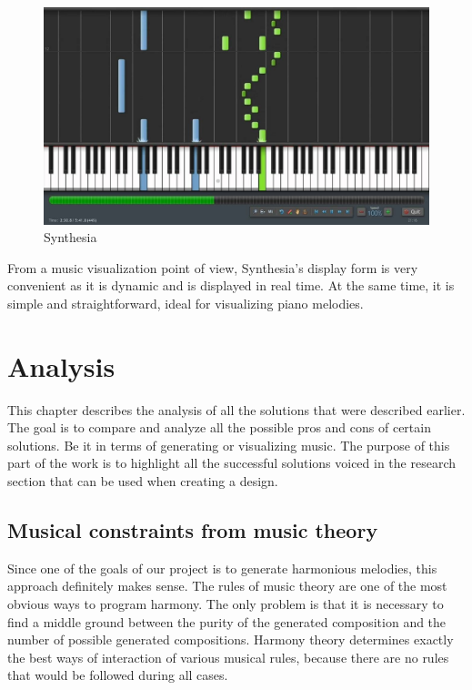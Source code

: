 \documentclass[thesis=B,english]{FITthesis}[2019/12/23]
\begin{document}
\begin{figure}[ht]
            \includegraphics[width=\textwidth]{synthesia.jpg}
            \caption{Synthesia}
            \label{fig:Synthesia}
\end{figure}

From a music visualization point of view, Synthesia's display form is very convenient as it is dynamic and is displayed in real time. At the same time, it is simple and straightforward, ideal for visualizing piano melodies.

\chapter{Analysis}

This chapter describes the analysis of all the solutions that were described earlier. The goal is to compare and analyze all the possible pros and cons of certain solutions. Be it in terms of generating or visualizing music. The purpose of this part of the work is to highlight all the successful solutions voiced in the research section that can be used when creating a design.

\section{Musical constraints from music theory}

Since one of the goals of our project is to generate harmonious melodies, this approach definitely makes sense. The rules of music theory are one of the most obvious ways to program harmony. The only problem is that it is necessary to find a middle ground between the purity of the generated composition and the number of possible generated compositions. Harmony theory determines exactly the best ways of interaction of various musical rules, because there are no rules that would be followed during all cases.
\end{document}

